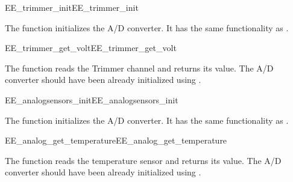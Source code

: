 \begin{function_nopb2}{EE\_trimmer\_init}{EE_trimmer_init}
  
  \begin{fundescription}
    The function initializes the A/D converter. 
    It has the same functionality as .
  \end{fundescription}
\end{function_nopb2}

\begin{function_nopb2}{EE\_trimmer\_get\_volt}{EE_trimmer_get_volt}
  
  \begin{fundescription}
    The function reads the Trimmer channel and returns its value. The
    A/D converter should have
    been already initialized using .
  \end{fundescription}
  
  \begin{funreturn}
  \end{funreturn}
\end{function_nopb2}



\begin{function_nopb2}{EE\_analogsensors\_init}{EE_analogsensors_init}
  
  \begin{fundescription}
    The function initializes the A/D converter. 
    It has the same functionality as .
  \end{fundescription}
\end{function_nopb2}

\begin{function_nopb2}{EE\_analog\_get\_temperature}{EE_analog_get_temperature}
  
  \begin{fundescription}
    The function reads the temperature sensor and returns its value. The
    A/D converter should have
    been already initialized using .
  \end{fundescription}
  
  \begin{funreturn}
  \end{funreturn}
\end{function_nopb2}

